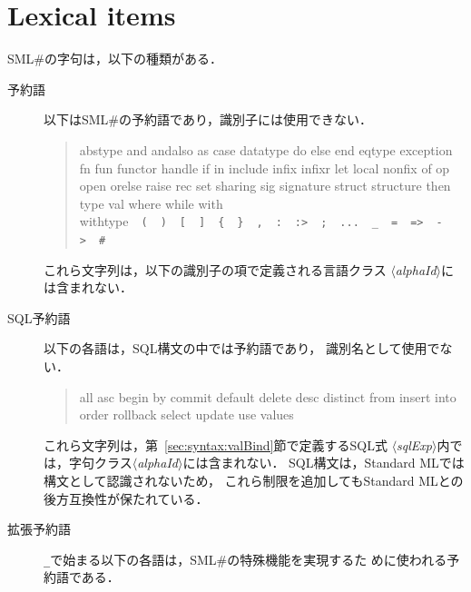 \documentclass{jbook}
\newif\ifjp
\newcommand{\txt}[2]{#2}
\newcommand{\smlsharp}{SML\#}
\newcommand{\code}[1]{\mbox{\large\tt #1}}
\newcommand{\nonterm}[1]{\mbox{$\langle$}{\it #1}\mbox{$\rangle$}}
\begin{document}
\else%
\fi%

\section{\txt{字句集合}{Lexical items}}
\label{sec:lexicalItems}
\ifjp%

	\smlsharp{}の字句は，以下の種類がある．
\begin{description}
\item[予約語] 
	以下は\smlsharp{}の予約語であり，識別子には使用できない．

\begin{tt}
\begin{quote}
abstype
and
andalso
as
case
datatype
do
else
end
eqtype
exception
fn
fun
functor
handle
if
in
include
infix
infixr
let
local
nonfix
of
op
open
orelse
raise
rec
set
sharing
sig
signature
struct
structure
then
type
val
where
while
with
withtype\ \
\verb|(|\ \
\verb|)|\ \
\verb([(\ \
\verb(](\ \
\verb({(\ \
\verb(}(\ \
\verb(,(\ \
\verb(:(\ \
\verb(:>(\ \
\verb(;(\ \
\verb(...(\ \
\verb(_(\ \
\verb(=(\ \
\verb(=>(\ \
\verb(->(\ \
\verb(#(
\end{quote}
\end{tt}

	これら文字列は，以下の識別子の項で定義される言語クラス
\nonterm{alphaId}には含まれない．


\item[SQL予約語] 
	以下の各語は，SQL構文の中では予約語であり，
識別名として使用でない．

\begin{tt}
\begin{quote}
all
asc
begin
by
commit
default
delete
desc
distinct
from
insert
into
order
rollback
select
update
use
values
\end{quote}
\end{tt}

	これら文字列は，第~\ref{sec:syntax:valBind}節で定義するSQL式
\nonterm{sqlExp}内では，字句クラス\nonterm{alphaId}には含まれない．
	SQL構文は，Standard MLでは構文として認識されないため，
これら制限を追加してもStandard MLとの後方互換性が保たれている．

\item[拡張予約語] 
	\code{\_}で始まる以下の各語は，\smlsharp{}の特殊機能を実現するた
めに使われる予約語である．


\end{description}
\end{document}
